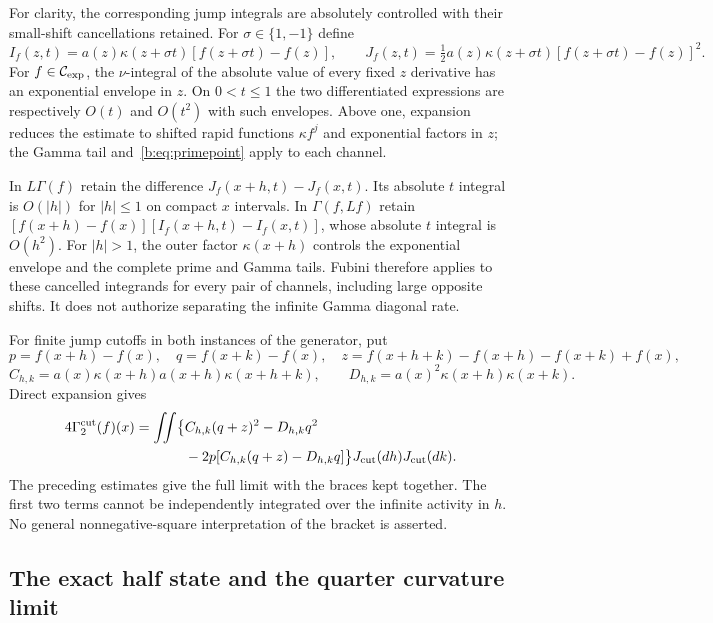 \documentclass[11pt,a4paper]{article}
\numberwithin{equation}{section}
\theoremstyle{definition}\newtheorem{definition}[theorem]{Definition}
\theoremstyle{remark}\newtheorem{remark}[theorem]{Remark}
\begin{document}
For clarity, the corresponding jump integrals are absolutely controlled with their small-shift cancellations retained. For $\sigma\in\{1,-1\}$ define
\[
 I_f(z,t)=a(z)\kappa(z+\sigma t)[f(z+\sigma t)-f(z)],\qquad
 J_f(z,t)=\tfrac12a(z)\kappa(z+\sigma t)[f(z+\sigma t)-f(z)]^2.
\]
For $f\in\mathcal C_{\exp}$, the $\nu$-integral of the absolute value of every fixed $z$ derivative has an exponential envelope in $z$. On $0<t\le1$ the two differentiated expressions are respectively $O(t)$ and $O(t^2)$ with such envelopes. Above one, expansion reduces the estimate to shifted rapid functions $\kappa f^j$ and exponential factors in $z$; the Gamma tail and~\eqref{b:eq:primepoint} apply to each channel.

In $L\Gamma(f)$ retain the difference $J_f(x+h,t)-J_f(x,t)$. Its absolute $t$ integral is $O(|h|)$ for $|h|\le1$ on compact $x$ intervals. In $\Gamma(f,Lf)$ retain
$[f(x+h)-f(x)][I_f(x+h,t)-I_f(x,t)]$, whose absolute $t$ integral is $O(h^2)$. For $|h|>1$, the outer factor $\kappa(x+h)$ controls the exponential envelope and the complete prime and Gamma tails. Fubini therefore applies to these cancelled integrands for every pair of channels, including large opposite shifts. It does not authorize separating the infinite Gamma diagonal rate.

For finite jump cutoffs in both instances of the generator, put
\[
 p=f(x+h)-f(x),\quad q=f(x+k)-f(x),\quad
 z=f(x+h+k)-f(x+h)-f(x+k)+f(x),
\]
\[
 C_{h,k}=a(x)\kappa(x+h)a(x+h)\kappa(x+h+k),\qquad
 D_{h,k}=a(x)^2\kappa(x+h)\kappa(x+k).
\]
Direct expansion gives
\begin{align}\label{b:eq:doublejump}
 4\Gamma_2^{\mathrm{cut}}(f)(x)
 =\iint\bigl\{&C_{h,k}(q+z)^2-D_{h,k}q^2\notag\\
 &-2p[C_{h,k}(q+z)-D_{h,k}q]\bigr\}
     J_{\mathrm{cut}}(dh)J_{\mathrm{cut}}(dk).
\end{align}
The preceding estimates give the full limit with the braces kept together. The first two terms cannot be independently integrated over the infinite activity in $h$. No general nonnegative-square interpretation of the bracket is asserted.

\subsection{The exact half state and the quarter curvature limit}\label{b:sec:curvature}
\end{document}
